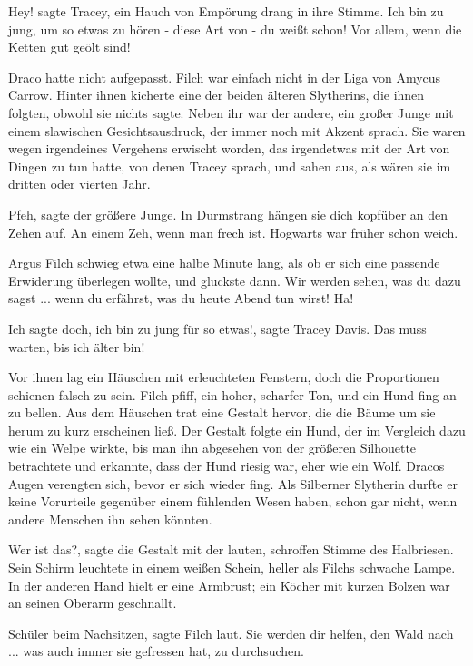 \glqq{}Hey!\grqq{} sagte Tracey, ein Hauch von Empörung drang in ihre Stimme.
\glqq{}Ich bin zu jung, um so etwas zu hören - diese Art von - du weißt
schon! Vor allem, wenn die Ketten gut geölt sind!\grqq{}

Draco hatte nicht aufgepasst. Filch war einfach nicht in der Liga von Amycus
Carrow. Hinter ihnen kicherte eine der beiden älteren Slytherins, die
ihnen folgten, obwohl sie nichts sagte. Neben ihr war der andere, ein
großer Junge mit einem slawischen Gesichtsausdruck, der immer noch mit
Akzent sprach. Sie waren wegen irgendeines Vergehens erwischt worden, das
irgendetwas mit der Art von Dingen zu tun hatte, von denen Tracey sprach,
und sahen aus, als wären sie im dritten oder vierten Jahr.

\glqq{}Pfeh\grqq{}, sagte der größere Junge. \glqq{}In Durmstrang hängen sie dich
kopfüber an den Zehen auf. An einem Zeh, wenn man frech ist. Hogwarts war
früher schon weich.\grqq{}

Argus Filch schwieg etwa eine halbe Minute lang, als ob er sich eine passende
Erwiderung überlegen wollte, und gluckste dann. \glqq{}Wir werden sehen,
was du dazu sagst ... wenn du erfährst, was du heute Abend tun wirst!
Ha!\grqq{}

\glqq{}Ich sagte doch, ich bin zu jung für so etwas!\grqq{}, sagte Tracey Davis.
\glqq{}Das muss warten, bis ich älter bin!\grqq{}

Vor ihnen lag ein Häuschen mit erleuchteten Fenstern, doch die Proportionen
schienen falsch zu sein. Filch pfiff, ein hoher, scharfer Ton, und ein
Hund fing an zu bellen. Aus dem Häuschen trat eine Gestalt hervor, die
die Bäume um sie herum zu kurz erscheinen ließ. Der Gestalt folgte ein
Hund, der im Vergleich dazu wie ein Welpe wirkte, bis man ihn abgesehen
von der größeren Silhouette betrachtete und erkannte, dass der Hund
riesig war, eher wie ein Wolf. Dracos Augen verengten sich, bevor er sich
wieder fing. Als Silberner Slytherin durfte er keine Vorurteile gegenüber
einem fühlenden Wesen haben, schon gar nicht, wenn andere Menschen ihn
sehen könnten.

\glqq{}Wer ist das?\grqq{}, sagte die Gestalt mit der lauten, schroffen Stimme
des Halbriesen. Sein Schirm leuchtete in einem weißen Schein, heller als
Filchs schwache Lampe. In der anderen Hand hielt er eine Armbrust; ein
Köcher mit kurzen Bolzen war an seinen Oberarm geschnallt.

\glqq{}Schüler beim Nachsitzen\grqq{}, sagte Filch laut. \glqq{}Sie werden dir
helfen, den Wald nach ... was auch immer sie gefressen hat, zu
durchsuchen.\grqq{}

